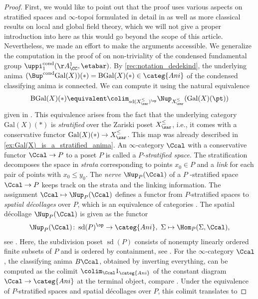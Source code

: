 \documentclass[leqno]{article}
\renewcommand{\Gal}{\mathrm{Gal}}
\newcommand{\Ani}{\categ{Ani}}
\newcommand{\cond}{\mathrm{cond}}
\newcommand{\Bcond}{\Bup^{\cond}}
\DeclareMathOperator{\BGal}{BGal}
\newcommand{\picond}{\uppi^{\cond}}
\newcommand{\pionecond}{\picond_1}
\newcommand{\Zpos}[1]{{#1}_{\zar}^{\leq}}
\DeclareMathOperator{\subdiv}{sd}
\begin{document}
\begin{proof}
First, we would like to point out that the proof uses various aspects on stratified spaces and $\infty$-topoi formulated in detail in \cite{Exodromy} as well as more classical results on local and global field theory, which we will not give a proper introduction into here as this would go beyond the scope of this article. Nevertheless, we made an effort to make the arguments accessible.
    We generalize the computation in the proof of \cite[Proposition 7.2]{The_condensed_homotopy_type} on non-triviality of the condensed fundamental group $\pionecond(\AA^1_{\CC}, \etabar)$.
    By \cref{rec:notation_dedekind}, the underlying anima $ (\Bcond\Gal(X))(\ast)=\BGal(X)(\ast)\in \Ani $ of the condensed classifying anima is connected.
    We can compute it using 
    the natural equivalence
    \begin{equation}\label{eq:classifying_anima_via_decollage}
        \BGal(X)(\ast) \equivalent \colim_{\subdiv(\Zpos{X})^{\op}} \Nup_{\Zpos{X}}(\Gal(X)(\pt))
    \end{equation}
given in \cite[Example 7.6]{The_condensed_homotopy_type}. This equivalence arises from the fact that the underlying category $\Gal(X)(\ast)$ is \textit{stratified} over the Zariski poset $\Zpos{X}$, i.e., it comes with a conservative functor $\Gal(X)(\ast) \rightarrow \Zpos{X}$. This map was already described in \cref{ex:Gal(X)_is_a_stratified_anima}. An $\infty$-category $\Ccal$  with a conservative functor $\Ccal \rightarrow P$ to a poset $P$ is called a \textit{$P$-stratified space}. The stratification decomposes the space in \textit{strata} corresponding to points $x_0\in P$ and a \textit{link} for each pair of points with $x_0 \leq y_0$.
The \textit{nerve} $\Nup_P(\Ccal)$ of a $P$ -stratified space $\Ccal \rightarrow P$ keeps track on the strata and the linking information. The assignment $\Ccal \mapsto \Nup_P(\Ccal)$ defines a functor from $P$-stratified spaces to \textit{spatial d\'ecollages} over $P$, which is an equivalence of categories \cite[Theorem 2.7.4]{Exodromy}.
The spatial d\'ecollage $\Nup_P(\Ccal)$ is given as the functor \begin{equation*}
       \Nup_{P}(\Ccal) \colon \subdiv(P)^{\op} \to \Ani, \ \Sigma \mapsto \Hom_{P}(\Sigma,\Ccal),
    \end{equation*}
see \cite[Construction 2.71]{Exodromy}.
Here, the subdivision poset $\subdiv(P)$ consists of nonempty linearly ordered finite subsets of $P$ and is ordered by containment, see \cite[Notation 1.1.8]{Exodromy}. For the $\infty$-category $\Ccal$, the classifying anima $B\Ccal$,  obtained by inverting everything, can be computed as the colimit $\colim_{\Ccal} 1_{\Ani}$ of the constant diagram $\Ccal \rightarrow \Ani$ at the terminal object, compare \cite[Notation 2.2.1]{exodromy}. Under the equivalence of $P$-stratified spaces and spatial d\'ecollages over $P$, this colimit translates to 

\end{proof}
\end{document}
